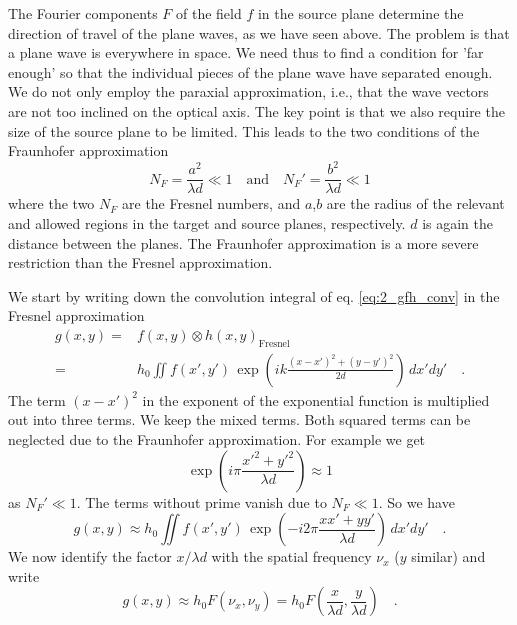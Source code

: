 The Fourier components $F$ of the field $f$ in the source plane determine the direction of travel of the plane waves, as we have seen above. The problem is that a plane wave is everywhere in space. We need thus to find a condition for 'far enough' so that the individual pieces of the plane wave have separated enough. We do not only employ the paraxial approximation, i.e., that the wave vectors are not too inclined on the optical axis. The key point is that we also require the size of the source plane to be limited. This leads to the two conditions of the Fraunhofer approximation
\begin{equation}
    N_F =  \frac{a^2}{\lambda d} \ll 1 \quad \text{and} \quad
    N_{F}' =  \frac{b^2}{\lambda d} \ll 1 
\end{equation}
where the two $N_F$ are the Fresnel numbers, and $a$,$b$ are the radius of the relevant and allowed regions in the target and source planes, respectively. $d$ is again the distance between the  planes. The Fraunhofer approximation is a more severe restriction than the Fresnel approximation.

We start by writing down the convolution integral of eq. \ref{eq:2_gfh_conv} in the Fresnel approximation
\begin{align}
    g(x,y) = & f(x,y) \otimes h(x,y)_\text{Fresnel} \\
 = & h_0 \iint f(x', y') \,  \exp \left(i k \frac{(x-x')^2 + (y-y')^2 }{2d} \right)  \, dx' dy' \quad .
\end{align}
The term $(x-x')^2$ in the exponent of the exponential function is multiplied out into three terms. 
We keep the mixed terms. Both squared terms can be neglected due to the Fraunhofer approximation. For example  we get 
\begin{equation}
    \exp \left(i \pi  \frac{x'^2 + y'^2 }{ \lambda d} \right) \approx 1
\end{equation}
as  $N_{F}' \ll 1$. The terms without prime vanish due to $N_{F} \ll 1$. So we have
\begin{equation}
    g(x,y)  \approx h_0   
     \iint f(x', y') \,  \exp \left(-i 2 \pi \frac{x x' + y y' }{\lambda d} \right)  \, dx' dy' \quad .
\end{equation}
We now identify  the factor $x / \lambda d$ with the spatial frequency  $\nu_x$ ($y$ similar) and write
\begin{equation}
    g(x,y) \approx h_0
     F \left( \nu_x,\nu_y \right) 
     =  h_0
     F \left( \frac{x}{\lambda d}, \frac{y}{\lambda d} \right) \quad .
\end{equation}

